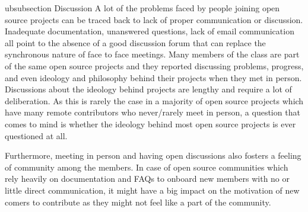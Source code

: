 ubsubsection {\bold Discussion}
\newline
A lot of the problems faced by people joining open source projects can be traced back to lack of proper communication or discussion. Inadequate documentation, unanswered questions, lack of email communication all point to the absence of a good discussion forum that can replace the synchronous nature of face to face meetings. Many members of the class are part of the same open source projects and they reported discussing problems, progress, and even ideology and philosophy behind their projects when they met in person. Discussions about the ideology behind projects are lengthy and require a lot of deliberation. As this is rarely the case in a majority of open source projects which have many remote contributors who never/rarely meet in person, a question that comes to mind is whether the ideology behind most open source projects is ever questioned at all. 

\newline
Furthermore, meeting in person and having open discussions also fosters a feeling of community among the members. In case of open source communities which rely heavily on documentation and FAQs to onboard new members with no or little direct communication, it might have a big impact on the motivation of new comers to contribute as they might not feel like a part of the community. 
